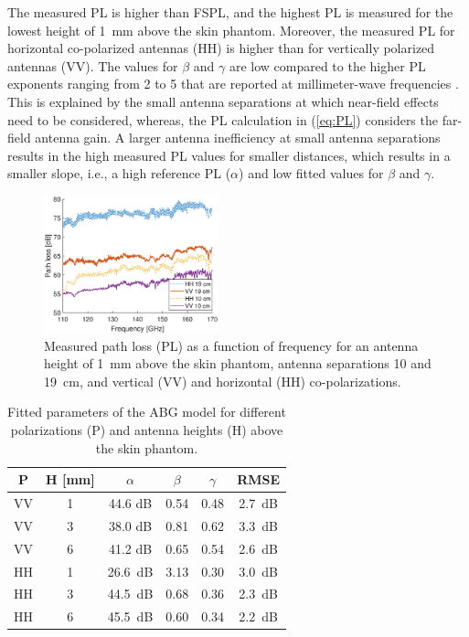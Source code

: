 \documentclass[preprint]{rsl}
\begin{document}
The measured PL is higher than FSPL, and the highest PL is measured for the lowest height of 1~mm above the skin phantom.
Moreover, the measured PL for horizontal co-polarized antennas (HH) is higher than for vertically polarized antennas (VV).
The values for $\beta$ and $\gamma$ are low compared to the higher PL exponents ranging from 2 to 5 that are reported at millimeter-wave frequencies \cite{Petrillo2014, Aminzadeh2021_tap}. 
This is explained by the small antenna separations at which near-field effects need to be considered, whereas, the PL calculation in (\ref{eq:PL}) considers the far-field antenna gain.
A larger antenna inefficiency at small antenna separations results in the high measured PL values for smaller distances, which results in a smaller slope, i.e., a high reference PL ($\alpha$) and low fitted values for $\beta$ and $\gamma$.

\begin{figure}[t]
\begin{center}
  \includegraphics[width=0.45\textwidth]{figures/PL_vs_freq}
\caption{Measured path loss (PL) as a function of frequency for an antenna height of 1~mm above the skin phantom, antenna separations 10 and 19~cm, and vertical (VV) and horizontal (HH) co-polarizations.}
\label{fig:PL_vs_freq}
\end{center}
\end{figure}
\begin{table}[t]
  \caption{Fitted parameters of the ABG model for different polarizations (P) and antenna heights (H) above the skin phantom.}
  \label{table:ABG}
  \begin{center}
    \begin{tabular}{cc|cccc}
      P & H [mm] & $\alpha$ & $\beta$ & $\gamma$ & RMSE \\
      \hline
      VV & 1 & 44.6 dB & 0.54 & 0.48 & 2.7~dB \\
      VV & 3 & 38.0 dB & 0.81 & 0.62 & 3.3~dB \\
      VV & 6 & 41.2 dB & 0.65 & 0.54 & 2.6~dB \\
      HH & 1 & 26.6~dB & 3.13 & 0.30 & 3.0~dB \\
      HH & 3 & 44.5~dB & 0.68 & 0.36 & 2.3~dB \\
      HH & 6 & 45.5~dB & 0.60 & 0.34 & 2.2~dB \\
    \end{tabular}
  \end{center}
\end{table}
\end{document}
